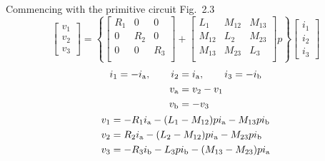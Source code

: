 \documentclass[a4paper,numbers=noenddot,12pt]{scrbook}
\begin{document}
        Commencing with the primitive circuit Fig.\ 2.3
        \begin{equation*}
            \begin{bmatrix}
                v_1 \\[1ex] v_2 \\[1ex] v_3
            \end{bmatrix}
            =
            \left\{
                \begin{bmatrix}
                    R_1 & 0 & 0 \\[1ex]
                    0 & R_2 & 0 \\[1ex]
                    0 & 0 & R_3 \\
                \end{bmatrix}
                +
                \begin{bmatrix}
                    L_1 & M_{12} & M_{13} \\[1ex]
                    M_{12} & L_2 & M_{23} \\[1ex]
                    M_{13} & M_{23} & L_3 \\
                \end{bmatrix}
            p \right\}
            \begin{bmatrix}
                i_1 \\[1ex] i_2 \\[1ex] i_3
            \end{bmatrix}
        \end{equation*}
        \begin{gather*}
            \begin{aligned}
                i_1 = -i_{\textup{a}}, \qquad i_2 & = i_{\textup{a}}, \qquad i_3 = -i_{\textup{b}} \\
                v_{\textup{a}} & = v_2 - v_1 \\
                v_{\textup{b}} & = -v_3
            \end{aligned}
            \\
            \begin{aligned}
                v_1 & = -R_1 i_{\textup{a}} - (L_1 - M_{12}) p i_{\textup{a}} - M_{13} p i_{\textup{b}} \\
                v_2 & = R_2 i_{\textup{a}} - (L_2 - M_{12}) p i_{\textup{a}} - M_{23} p i_{\textup{b}} \\
                v_3 & = -R_3 i_{\textup{b}} - L_3 p i_{\textup{b}} - (M_{13} - M_{23}) p i_{\textup{a}} \\
            \end{aligned}
        \end{gather*}
\end{document}
